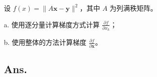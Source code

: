 \begin{example}
    设 \( f(x) = \|A\bm{x} - \bm{y}\|^2 \)，其中 \( A \) 为列满秩矩阵。
    
    a. 使用逐分量计算梯度方式计算 \(\frac{\partial f}{\partial x_k}\)；
    
    b. 使用整体的方法计算梯度 \(\frac{\partial f}{\partial \bm{x}}\)。
    \end{example}

    \subsection*{Ans.}
    